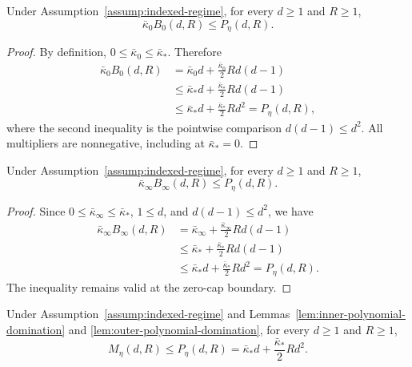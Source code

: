 \begin{lemma}
\label{lem:inner-polynomial-domination}
Under Assumption~\ref{assump:indexed-regime}, for every $d\geq1$ and $R\geq1$,
\[
\bar\kappa_0B_0(d,R)\leq P_\eta(d,R).
\]
\end{lemma}

\begin{proof}
By definition, $0\leq\bar\kappa_0\leq\bar\kappa_*$.  Therefore
\[
\begin{aligned}
\bar\kappa_0B_0(d,R)
&=\bar\kappa_0d+\frac{\bar\kappa_0}{2}Rd(d-1)\\
&\leq\bar\kappa_*d+\frac{\bar\kappa_*}{2}Rd(d-1)\\
&\leq\bar\kappa_*d+\frac{\bar\kappa_*}{2}Rd^2
=P_\eta(d,R),
\end{aligned}
\]
where the second inequality is the pointwise comparison
$d(d-1)\leq d^2$.  All multipliers are nonnegative, including at
$\bar\kappa_*=0$.
\end{proof}

\begin{lemma}
\label{lem:outer-polynomial-domination}
Under Assumption~\ref{assump:indexed-regime}, for every $d\geq1$ and $R\geq1$,
\[
\bar\kappa_\infty B_\infty(d,R)\leq P_\eta(d,R).
\]
\end{lemma}

\begin{proof}
Since $0\leq\bar\kappa_\infty\leq\bar\kappa_*$, $1\leq d$, and
$d(d-1)\leq d^2$, we have
\[
\begin{aligned}
\bar\kappa_\infty B_\infty(d,R)
&=\bar\kappa_\infty+\frac{\bar\kappa_\infty}{2}Rd(d-1)\\
&\leq\bar\kappa_*+\frac{\bar\kappa_*}{2}Rd(d-1)\\
&\leq\bar\kappa_*d+\frac{\bar\kappa_*}{2}Rd^2
=P_\eta(d,R).
\end{aligned}
\]
The inequality remains valid at the zero-cap boundary.
\end{proof}

\begin{proposition}
\label{prop:fixed-eta-polynomial-specialization}
Under Assumption~\ref{assump:indexed-regime} and
Lemmas~\ref{lem:inner-polynomial-domination} and
\ref{lem:outer-polynomial-domination}, for every $d\geq1$ and $R\geq1$,
\[
M_\eta(d,R)\leq P_\eta(d,R)
=\bar\kappa_*d+\frac{\bar\kappa_*}{2}Rd^2.
\]
\end{proposition}

